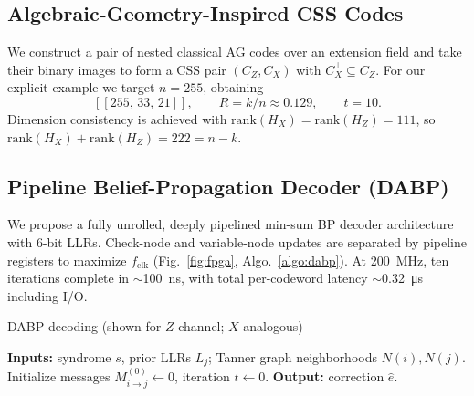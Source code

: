 \documentclass[conference]{IEEEtran}
\begin{document}
\subsection{Algebraic-Geometry-Inspired CSS Codes}
We construct a pair of nested classical AG codes over an extension field and take their binary images to form a CSS pair \((C_Z,C_X)\) with \(C_X^\perp \subseteq C_Z\). For our explicit example we target \(n=255\), obtaining
\[
  [[255,\,33,\,21]] ,\qquad R=k/n\approx 0.129,\qquad t=10.
\]
Dimension consistency is achieved with \(\mathrm{rank}(H_X)=\mathrm{rank}(H_Z)=111\), so \(\mathrm{rank}(H_X)+\mathrm{rank}(H_Z)=222=n-k\).

\subsection{Pipeline Belief-Propagation Decoder (DABP)}\label{sec:implementation}
We propose a fully unrolled, deeply pipelined min-sum BP decoder architecture with 6-bit LLRs. Check-node and variable-node updates are separated by pipeline registers to maximize \(f_\mathrm{clk}\) (Fig.~\ref{fig:fpga}, Algo.~\ref{algo:dabp}). At \SI{200}{\mega\hertz}, ten iterations complete in \(\sim\)\SI{100}{\nano\second}, with total per-codeword latency \(\sim\)\SI{0.32}{\micro\second} including I/O.

\begin{algorithm}[t]
\DontPrintSemicolon
\caption{DABP decoding (shown for \(Z\)-channel; \(X\) analogous)}\label{algo:dabp}
\textbf{Inputs:} syndrome \(s\), prior LLRs \(L_j\); Tanner graph neighborhoods \(N(i),N(j)\).\\
Initialize messages \(M_{i\to j}^{(0)}\gets 0\), iteration \(t\gets0\).\;
\textbf{Output:} correction \(\hat e\).\;
\end{algorithm}
\end{document}
